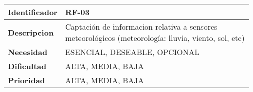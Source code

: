\begin{center}
    \begin{tabular}{|p{2.6cm}|p{12cm}|}
    \hline
    \textbf{Identificador} & RF-03\\
    \hline
    \textbf{Descripcion} & Captación de informacion relativa a sensores meteorológicos (meteorología: lluvia, viento, sol, etc)\\
    \hline
    \textbf{Necesidad} & ESENCIAL, DESEABLE, OPCIONAL\\
    \hline
    \textbf{Dificultad} & ALTA, MEDIA, BAJA\\
    \hline
    \textbf{Prioridad} & ALTA, MEDIA, BAJA\\
    \hline
    \end{tabular}
\end{center}

